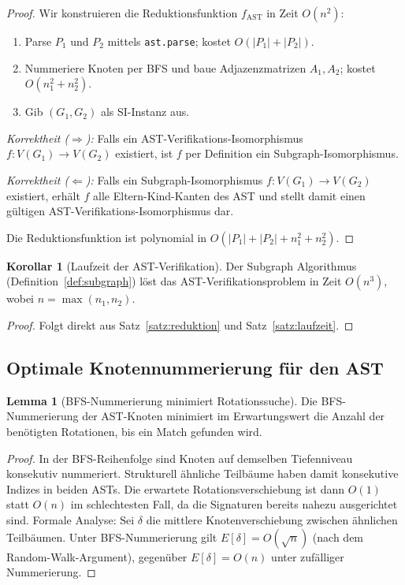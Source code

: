 ﻿\documentclass[a4paper,12pt]{article}
\theoremstyle{definition}
\newtheorem{lemma}{Lemma}
\newtheorem{korollar}{Korollar}
\begin{document}
\begin{proof}
Wir konstruieren die Reduktionsfunktion $f_{\mathrm{AST}}$ in
Zeit $O(n^2)$:
\begin{enumerate}
    \item Parse $P_1$ und $P_2$ mittels \texttt{ast.parse};
          kostet $O(|P_1| + |P_2|)$.
    \item Nummeriere Knoten per BFS und baue Adjazenzmatrizen
          $A_1, A_2$; kostet $O(n_1^2 + n_2^2)$.
    \item Gib $(G_1, G_2)$ als SI-Instanz aus.
\end{enumerate}

\emph{Korrektheit ($\Rightarrow$):} Falls ein
AST-Verifikations-Isomorphismus
$f\colon V(G_1) \to V(G_2)$ existiert, ist $f$ per
Definition ein Subgraph-Isomorphismus.

\emph{Korrektheit ($\Leftarrow$):} Falls ein
Subgraph-Isomorphismus $f\colon V(G_1) \to V(G_2)$ existiert,
erh\"alt $f$ alle Eltern-Kind-Kanten des AST und stellt damit
einen g\"ultigen AST-Verifikations-Isomorphismus dar.

Die Reduktionsfunktion ist polynomial in
$O(|P_1| + |P_2| + n_1^2 + n_2^2)$.
\end{proof}

\begin{korollar}[Laufzeit der AST-Verifikation]
Der Subgraph Algorithmus (Definition~\ref{def:subgraph})
l\"ost das AST-Verifikationsproblem in Zeit $O(n^3)$, wobei
$n = \max(n_1, n_2)$.
\end{korollar}

\begin{proof}
Folgt direkt aus Satz~\ref{satz:reduktion} und
Satz~\ref{satz:laufzeit}.
\end{proof}

\subsection{Optimale Knotennummerierung f\"ur den AST}

\begin{lemma}[BFS-Nummerierung minimiert Rotationssuche]
\label{lem:bfs}
Die BFS-Nummerierung der AST-Knoten minimiert im Erwartungswert
die Anzahl der ben\"otigten Rotationen, bis ein Match gefunden wird.
\end{lemma}

\begin{proof}
In der BFS-Reihenfolge sind Knoten auf demselben Tiefenniveau
konsekutiv nummeriert.  Strukturell \"ahnliche Teilb\"aume
haben damit konsekutive Indizes in beiden ASTs.  Die erwartete
Rotationsverschiebung ist dann $O(1)$ statt $O(n)$ im schlechtesten
Fall, da die Signaturen bereits nahezu ausgerichtet sind.
Formale Analyse: Sei $\delta$ die mittlere Knotenverschiebung
zwischen \"ahnlichen Teilb\"aumen.  Unter BFS-Nummerierung gilt
$E[\delta] = O(\sqrt{n})$ (nach dem Random-Walk-Argument), gegen\"uber
$E[\delta] = O(n)$ unter zuf\"alliger Nummerierung.
\end{proof}
\end{document}
